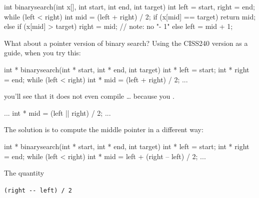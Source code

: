 \begin{consolethree}[escapeinside=||]
int binarysearch(int x[], int start, int end,
                 int target)
{
    int left = start, right = end;
    while (left < right)
    {
        int mid = (left + right) / 2;
        if (x[mid] == target)
        {
            return mid;
        }
        else if (x[mid] > target)
        {
            right = mid; // note: no "- 1"
        }
        else
        {
            left = mid + 1;
        }
    }
}
\end{consolethree}

What about a pointer version of binary search? Using the CISS240 version as a guide, when you try this:

\begin{consolethree}[escapeinside=||]
int * binarysearch(int * start, int * end,
                   int target)
{
    int * left = start;
    int * right = end;
    while (left < right)
    {
        int * mid = (left + right) / 2;
        ...
    }
}
\end{consolethree}

you'll see that it does not even compile \ldots{} because you .

\begin{consolethree}[escapeinside=||]
...
int * mid = (left |\EMPHASIZE{ +}| right) / 2;
...
\end{consolethree}

The solution is to compute the middle pointer in a different way:

\begin{consolethree}[escapeinside=||]
int * binarysearch(int * start, int * end,
                   int target)
{
    int * left = start;
    int * right = end;
    while (left < right)
    {
        int * mid = left + (right -- left) / 2;
        ...
    }
}
\end{consolethree}

The quantity

\verb!(right -- left) / 2!

